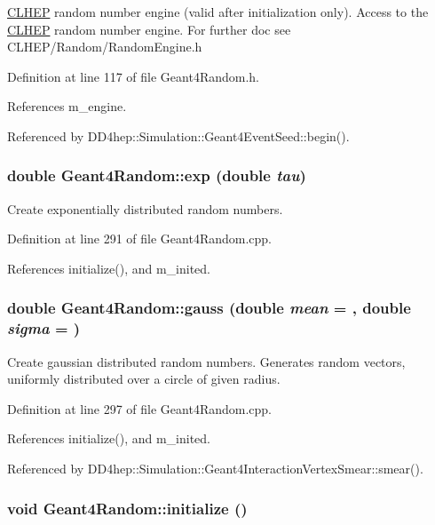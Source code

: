 \hyperlink{namespace_c_l_h_e_p}{CLHEP} random number engine (valid after initialization only). Access to the \hyperlink{namespace_c_l_h_e_p}{CLHEP} random number engine. For further doc see CLHEP/Random/RandomEngine.h 

Definition at line 117 of file Geant4Random.h.

References m\_\-engine.

Referenced by DD4hep::Simulation::Geant4EventSeed::begin().\hypertarget{class_d_d4hep_1_1_simulation_1_1_geant4_random_a676f18f9a0f12e26e67f5390c2f6a5b7}{
\subsubsection[{exp}]{\setlength{\rightskip}{0pt plus 5cm}double Geant4Random::exp (double {\em tau})}}
\label{class_d_d4hep_1_1_simulation_1_1_geant4_random_a676f18f9a0f12e26e67f5390c2f6a5b7}


Create exponentially distributed random numbers. 

Definition at line 291 of file Geant4Random.cpp.

References initialize(), and m\_\-inited.\hypertarget{class_d_d4hep_1_1_simulation_1_1_geant4_random_a759d26cbc394bdbd9d34196c33b7419e}{
\subsubsection[{gauss}]{\setlength{\rightskip}{0pt plus 5cm}double Geant4Random::gauss (double {\em mean} = {}, \/  double {\em sigma} = {})}}
\label{class_d_d4hep_1_1_simulation_1_1_geant4_random_a759d26cbc394bdbd9d34196c33b7419e}


Create gaussian distributed random numbers. Generates random vectors, uniformly distributed over a circle of given radius. 

Definition at line 297 of file Geant4Random.cpp.

References initialize(), and m\_\-inited.

Referenced by DD4hep::Simulation::Geant4InteractionVertexSmear::smear().\hypertarget{class_d_d4hep_1_1_simulation_1_1_geant4_random_a31f43f8b61c1eacccac4d89945e97f6b}{
\subsubsection[{initialize}]{\setlength{\rightskip}{0pt plus 5cm}void Geant4Random::initialize ()}}
\label{class_d_d4hep_1_1_simulation_1_1_geant4_random_a31f43f8b61c1eacccac4d89945e97f6b}


